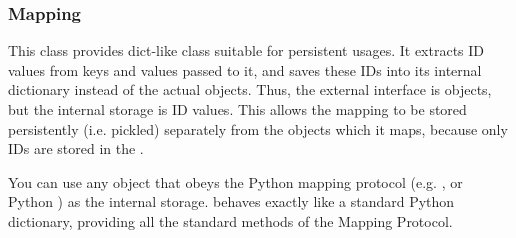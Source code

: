 \documentclass{howto}
\begin{document}
\subsubsection{Mapping}
This class provides dict-like class suitable for persistent usages.  
It extracts ID values from
keys and values passed to it, and saves these IDs into its internal dictionary
instead of the actual objects.  Thus, the external interface is objects,
but the internal storage is ID values.  This allows the mapping to be stored
persistently (i.e. pickled) separately from the objects which it maps, 
because only IDs are stored in the .

You can use any object that obeys the
Python mapping protocol (e.g. , or Python ) 
as the internal storage.   behaves exactly like a standard
Python dictionary, providing all the standard methods of the Mapping Protocol.
\end{document}
